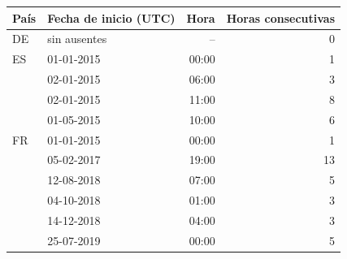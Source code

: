 \begin{tabular}{llrr}
\toprule
País & Fecha de inicio (UTC) & Hora & Horas consecutivas \\
\midrule
DE & sin ausentes & -- & 0 \\
\midrule
ES & 01-01-2015 & 00:00 & 1 \\
 & 02-01-2015 & 06:00 & 3 \\
 & 02-01-2015 & 11:00 & 8 \\
 & 01-05-2015 & 10:00 & 6 \\
\midrule
FR & 01-01-2015 & 00:00 & 1 \\
 & 05-02-2017 & 19:00 & 13 \\
 & 12-08-2018 & 07:00 & 5 \\
 & 04-10-2018 & 01:00 & 3 \\
 & 14-12-2018 & 04:00 & 3 \\
 & 25-07-2019 & 00:00 & 5 \\
\bottomrule
\end{tabular}